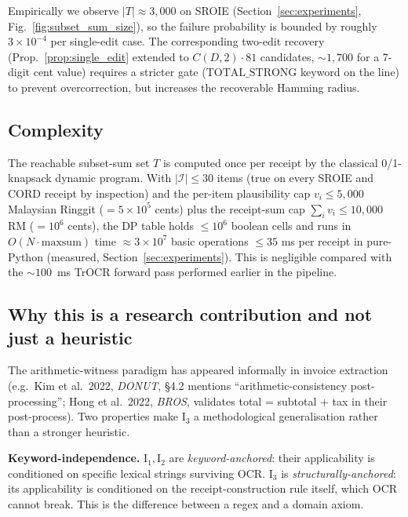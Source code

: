 \noindent
Empirically we observe $|T| \approx 3{,}000$ on SROIE
(Section~\ref{sec:experiments}, Fig.~\ref{fig:subset_sum_size}), so
the failure probability is bounded by roughly $3 \times 10^{-4}$ per
single-edit case.  The corresponding two-edit recovery
(Prop.~\ref{prop:single_edit} extended to $C(D,2)\cdot 81$ candidates,
$\sim 1{,}700$ for a 7-digit cent value) requires a stricter gate
($\mathrm{TOTAL\_STRONG}$ keyword on the line) to prevent
overcorrection, but increases the recoverable Hamming radius.

\subsection{Complexity}
\label{sec:focus_sigma_complexity}

The reachable subset-sum set $T$ is computed once per receipt by the
classical 0/1-knapsack dynamic program.  With $|\mathcal{I}| \le 30$
items (true on every SROIE and CORD receipt by inspection) and the
per-item plausibility cap $v_i \le 5{,}000$ Malaysian Ringgit
($= 5\times 10^5$ cents) plus the receipt-sum cap
$\sum_i v_i \le 10{,}000$ RM ($= 10^6$ cents), the DP table holds
$\le 10^6$ boolean cells and runs in $O(N \cdot \mathrm{maxsum})$ time
$\approx 3 \times 10^7$ basic operations $\le 35$ ms per receipt in
pure-Python (measured, Section~\ref{sec:experiments}).  This is
negligible compared with the $\sim 100$~ms TrOCR forward pass
performed earlier in the pipeline.

\subsection{Why this is a research contribution and not just a heuristic}
\label{sec:focus_sigma_position}

The arithmetic-witness paradigm has appeared informally in invoice
extraction (e.g.\ Kim et al.\ 2022, \emph{DONUT}, §4.2 mentions
``arithmetic-consistency post-processing''; Hong et al.\ 2022,
\emph{BROS}, validates total = subtotal + tax in their post-process).
Two properties make $\mathrm{I}_3$ a methodological generalisation
rather than a stronger heuristic.

\textbf{Keyword-independence.}  $\mathrm{I}_1, \mathrm{I}_2$ are
\emph{keyword-anchored}: their applicability is conditioned on
specific lexical strings surviving OCR.  $\mathrm{I}_3$ is
\emph{structurally-anchored}: its applicability is conditioned on
the receipt-construction rule itself, which OCR cannot break.  This
is the difference between a regex and a domain axiom.

